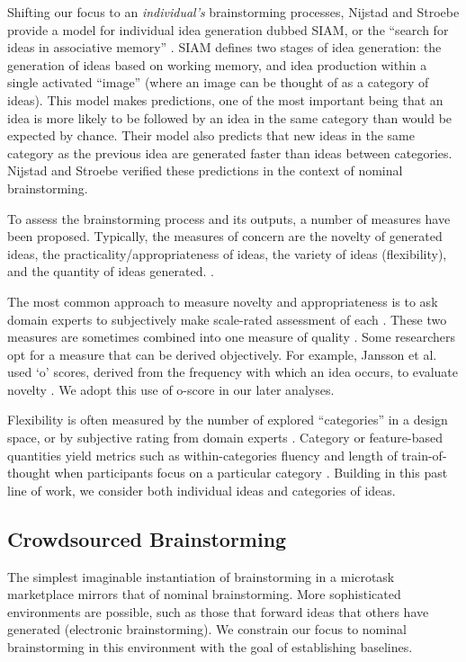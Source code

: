 Shifting our focus to an \emph{individual's} brainstorming processes, Nijstad and Stroebe provide a model for individual idea generation dubbed SIAM, or the ``search for ideas in associative memory'' \cite{nijstad_how_2006}. SIAM defines two stages of idea generation: the generation of ideas based on working memory, and idea production within a single activated ``image'' (where an image can be thought of as a category of ideas). This model makes predictions, one of the most important being that an idea is more likely to be followed by an idea in the same category than would be expected by chance. Their model also predicts that new ideas in the same category as the previous idea are generated faster than ideas between categories. Nijstad and Stroebe verified these predictions in the context of nominal brainstorming.

To assess the brainstorming process and its outputs, a number of measures have been proposed. Typically, the measures of concern are the novelty of generated ideas, the practicality/appropriateness of ideas, the variety of ideas (flexibility), and the quantity of ideas generated. \cite{finke1992creative, shah2003metrics}.

The most common approach to measure novelty and appropriateness is to ask domain experts to subjectively make scale-rated assessment of each \cite{lewis2011affective, amabile_1983}. These two measures are sometimes combined into one measure of quality \cite{little2010exploring}.
Some researchers opt for a measure that can be derived objectively. For example, Jansson et al. used `o' scores, derived from the frequency with which an idea occurs, to evaluate novelty \cite{jansson_design_1991}. We adopt this use of o-score in our later analyses.

Flexibility is often measured by the number of explored ``categories'' in a design space, or by subjective rating from domain experts \cite{lewis2011affective, marsh1996examples}. Category or feature-based quantities yield metrics such as within-categories fluency and length of train-of-thought when participants focus on a particular category \cite{nijstad_how_2006}. Building in this past line of work, we consider both individual ideas and categories of ideas.

\subsection{Crowdsourced Brainstorming}
The simplest imaginable instantiation of brainstorming in a microtask marketplace mirrors that of nominal brainstorming. More sophisticated environments are possible, such as those that forward ideas that others have generated (electronic brainstorming). 
We constrain our focus to nominal brainstorming in this environment with the goal of establishing baselines.

